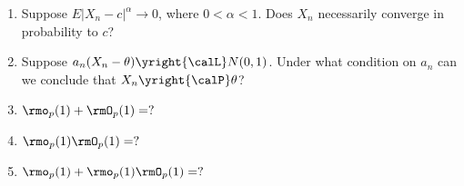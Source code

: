 \begin{problem}[DasGupta 7.2 (a), (b), (c), (d), (e)]
  \begin{enumerate}[label=(\alph*),noitemsep]
  \item Suppose \(E|X_n-c|^\alpha\to 0\), where \(0<\alpha<1\). Does
    \(X_n\) necessarily converge in probability to \(c\)?
  \item Suppose \(a_n(X_n-\theta)\yright{\calL}N(0,1)\). Under what
    condition on \(a_n\) can we conclude that \(X_n\yright{\calP}\theta\)?
  \item \(\rmo_p(1)+\rmO_p(1)=?\)
  \item \(\rmo_p(1)\rmO_p(1)=?\)
  \item \(\rmo_p(1)+\rmo_p(1)\rmO_p(1)=?\)
  \end{enumerate}
\end{problem}
